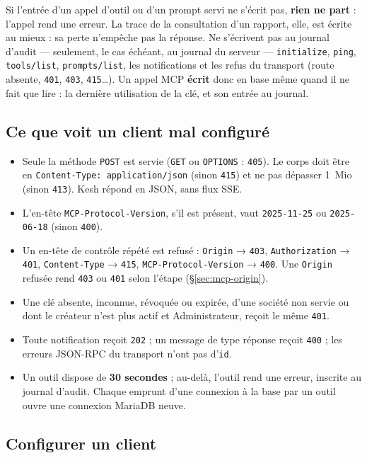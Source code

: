 \documentclass[a4paper,11pt,oneside]{article}
\begin{document}
Si l'entrée d'un appel d'outil ou d'un prompt servi ne s'écrit pas, \textbf{rien ne part} : l'appel rend une erreur. La trace de la consultation d'un rapport, elle, est écrite au mieux : sa perte n'empêche pas la réponse. Ne s'écrivent pas au journal d'audit --- seulement, le cas échéant, au journal du serveur --- \texttt{initialize}, \texttt{ping}, \texttt{tools/list}, \texttt{prompts/list}, les notifications et les refus du transport (route absente, \texttt{401}, \texttt{403}, \texttt{415}\ldots). Un appel MCP \textbf{écrit} donc en base même quand il ne fait que lire : la dernière utilisation de la clé, et son entrée au journal.

\subsection{Ce que voit un client mal configuré}\label{sec:mcp-erreurs}

\begin{itemize}
    \item Seule la méthode \texttt{POST} est servie (\texttt{GET} ou \texttt{OPTIONS} : \texttt{405}). Le corps doit être en \texttt{Content-Type: application/json} (sinon \texttt{415}) et ne pas dépasser 1~Mio (sinon \texttt{413}). Kesh répond en JSON, sans flux SSE.
    \item L'en-tête \texttt{MCP-Protocol-Version}, s'il est présent, vaut \texttt{2025-11-25} ou \texttt{2025-06-18} (sinon \texttt{400}).
    \item Un en-tête de contrôle répété est refusé : \texttt{Origin} → \texttt{403}, \texttt{Authorization} → \texttt{401}, \texttt{Content-Type} → \texttt{415}, \texttt{MCP-Protocol-Version} → \texttt{400}. Une \texttt{Origin} refusée rend \texttt{403} ou \texttt{401} selon l'étape (\S\ref{sec:mcp-origin}).
    \item Une clé absente, inconnue, révoquée ou expirée, d'une société non servie ou dont le créateur n'est plus actif et Administrateur, reçoit le même \texttt{401}.
    \item Toute notification reçoit \texttt{202} ; un message de type réponse reçoit \texttt{400} ; les erreurs JSON-RPC du transport n'ont pas d'\texttt{id}.
    \item Un outil dispose de \textbf{30 secondes} ; au-delà, l'outil rend une erreur, inscrite au journal d'audit. Chaque emprunt d'une connexion à la base par un outil ouvre une connexion MariaDB neuve.
\end{itemize}

\subsection{Configurer un client}\label{sec:mcp-client}
\end{document}
